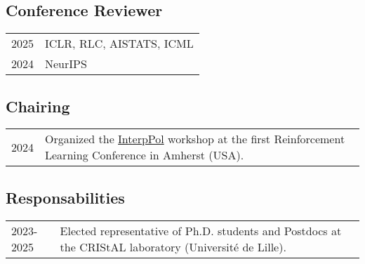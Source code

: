 

\subsection*{Conference Reviewer}
% 
\begin{longtable}[l]{@{}p{} p{}}

    2025 & ICLR, RLC, AISTATS, ICML \\
    2024 & NeurIPS
    
\end{longtable}

\subsection*{Chairing}
% 
\begin{longtable}[l]{@{}p{} p{}}

    2024 & Organized the \href{https://sites.google.com/view/interppol-workshop/home?authuser=0}{InterpPol} workshop at the first Reinforcement Learning Conference in Amherst (USA).
    
\end{longtable}

\subsection*{Responsabilities}
% 
\begin{longtable}[l]{@{}p{} p{}}

    2023-2025 & Elected representative of Ph.D. students and Postdocs at the CRIStAL laboratory (Universit\'e de Lille).
    
\end{longtable}


